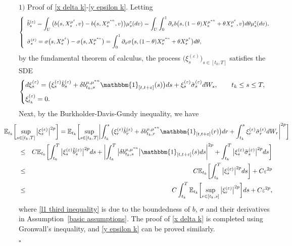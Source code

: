 \documentclass[12pt]{article}
\theoremstyle{named}
\numberwithin{equation}{section}
\newenvironment{Proof}{\removelastskip\par\medskip \noindent{\em Proof.} \rm}{\penalty-20\null\hfill$\square$\par\medbreak}
\begin{document}
\begin{Proof}
$1)$ Proof of \eqref{x delta k}-\eqref{y epsilon k}.
 Letting
$$
  \left\{
  \begin{array}{l}
  \displaystyle
  \tilde{b}^{(\varepsilon )}_s
  =
  \int_U \big(
  b\big(s, X^{\mu^\varepsilon}_s, v\big)
  -
   b\big(s, X^{\mu^{*n}}_s , v\big) \big) \mu^\varepsilon _s(dv)
=
    \int_U \int_0^1 \partial_xb\big(s, (1-\theta)X^{\mu^{*n}}_s + \theta X^{\mu^\varepsilon}_s, v\big) d\theta \mu^\varepsilon _s(dv)
    ,
\medskip
\\
\displaystyle
\tilde{\sigma}^{(\varepsilon )}_s
= \sigma\big(s, X^{\mu^\varepsilon}_s\big)
-
\sigma\big(s, X^{\mu^{*n}}_s \big)
= \int_0^1 \partial_x\sigma\big(s, (1-\theta)X^{\mu^{*n}}_s + \theta X^{\mu^\varepsilon}_s\big) d\theta,
  \end{array}
  \right.
  $$
  by the fundamental theorem of calculus,
  the process $\big(\xi^{(\varepsilon)}_s\big)_{s\in [t_k,T]}$ satisfies the SDE
$$
\begin{cases}
  d\xi^{(\varepsilon)}_s = \big(\xi^{(\varepsilon)}_s
  \tilde{b}^{(\varepsilon )}_s  + \delta b^{\mu,\mu^{*n} }_{t_k ,s}\mathbbm{1}_{[t,t+\varepsilon]}(s)\big) ds + \xi^{(\varepsilon)}_s\tilde{\sigma}^{(\varepsilon )}_s  dW_s, \qquad t_k \leq s \leq T,
\medskip
\\
\xi^{(\varepsilon)}_{t_k} = 0.
\end{cases}
$$
  Next, by the Burkholder-Davis-Gundy inequality, we have
\begin{eqnarray}
  \lefteqn{
     \!   \! \! \! \! \! \! \! \! \! \! \! \! \!
    \mathbb{E}_{t_k}\biggl[\sup\limits_{s \in [t_k,T]} \big| \xi^{(\varepsilon)}_s\big|^{2p} \biggr]
   = \mathbb{E}_{t_k} \biggl[\sup\limits_{s \in [t_k,T]}
       \biggl| \int_{t_k}^s \big(\xi^{(\varepsilon)}_r \tilde{b}^{(\varepsilon )}_r  + \delta b^{\mu,\mu^{*n} }_{t_k ,r}\mathbbm{1}_{[t,t+\varepsilon]}(r)\big) dr + \int_{t_k}^s \xi^{(\varepsilon)}_r \tilde{\sigma}^{(\varepsilon )}_r  dW_r\biggr|^{2p}
    \biggr]
  }
  \nonumber
  \\
  &\leq & C \mathbb{E}_{t_k}\biggl[
    \int_{t_k}^T\big| \xi^{(\varepsilon)}_s \tilde{b}^{(\varepsilon )}_s \big|^{2p} ds
    + \biggl|
    \int_{t_k}^T \big| \delta b^{\mu,\mu^{*n} }_{t_k ,s} \big|
    \mathbbm{1}_{[t,t+\varepsilon]}(s) ds\biggr|^{2p} + \int_{t_k}^T \big| \xi^{(\varepsilon)}_s
     \tilde{\sigma}^{(\varepsilon )}_s \big|^{2p} ds
    \biggr]
  \nonumber
  \\
  & \leq & C \mathbb{E}_{t_k}\biggl[
    \int_{t_k}^T \big| \xi^{(\varepsilon)}_s\big|^{2p} ds
    \biggr] + C \varepsilon^{2p}
    \label{l1 third inequality}
  \\
  & \leq & C  \int_{t_k}^T\mathbb{E}_{t_k}\biggl[\sup\limits_{r \in [t_k,s]}
    \big| \xi^{(\varepsilon)}_r\big|^{2p} \biggr] ds  + C \varepsilon^{2p} ,\nonumber
\end{eqnarray}
where
\eqref{l1 third inequality} is due to the boundedness of $b$, $\sigma$ and their derivatives in Assumption~\ref{basic assumptions}.
The proof of \eqref{x delta k} is completed using Gronwall's inequality,
and \eqref{y epsilon k} can be proved similarly.


\end{Proof}
\end{document}
